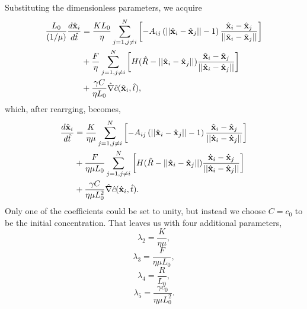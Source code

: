 Substituting the dimensionless parameters, we acquire
\begin{equation*}
    \begin{split}
        \frac{L_0}{(1/\mu)}\frac{d \hat{\vb{x}}_i}{d \hat{t}} &= 
        \frac{K L_0}{ \eta}\sum_{j = 1, j \neq i}^N   \left[ - A_{ij}\left( ||\hat{\vb{x}}_i - \hat{\vb{x}}_j|| -  1\right) \frac{\hat{\vb{x}}_i - \hat{\vb{x}}_j}{||\hat{\vb{x}}_i - \hat{\vb{x}}_j||} \right]\\
         &+ \frac{F}{  \eta}\sum_{j = 1, j \neq i}^N \left[H(\hat{R} - ||\hat{\vb{x}}_i - \hat{\vb{x}}_j||) \frac{\hat{\vb{x}}_i - \hat{\vb{x}}_j}{||\hat{\vb{x}}_i - \hat{\vb{x}}_j||}     \right]\\ 
         &+ \frac{\gamma C}{ \eta L_0} \hat{\nabla}  \hat{c} (\hat{\vb{x}}_i, \hat{t}),
    \end{split}
\end{equation*}
which, after rearrging, becomes,
\begin{equation*}
    \begin{split}
        \frac{d \hat{\vb{x}}_i}{d \hat{t}} &= 
        \frac{K}{ \eta \mu}\sum_{j = 1, j \neq i}^N   \left[ - A_{ij}\left( ||\hat{\vb{x}}_i - \hat{\vb{x}}_j|| -  1\right) \frac{\hat{\vb{x}}_i - \hat{\vb{x}}_j}{||\hat{\vb{x}}_i - \hat{\vb{x}}_j||} \right]\\
         &+ \frac{F}{  \eta \mu L_0}\sum_{j = 1, j \neq i}^N \left[H(\hat{R} - ||\hat{\vb{x}}_i - \hat{\vb{x}}_j||) \frac{\hat{\vb{x}}_i - \hat{\vb{x}}_j}{||\hat{\vb{x}}_i - \hat{\vb{x}}_j||}     \right]\\ 
         &+ \frac{\gamma C}{ \eta \mu L_0^2} \hat{\nabla}  \hat{c} (\hat{\vb{x}}_i, \hat{t}).
    \end{split}
\end{equation*}
Only one of the coefficients could be set to unity, but instead we choose $C = c_0$ to be the initial 
concentration. That leaves us with four additional parameters,
\begin{equation*}
    \lambda_2 = \frac{K}{ \eta \mu},
\end{equation*}
\begin{equation*}
    \lambda_3 = \frac{F}{  \eta \mu L_0},
\end{equation*}
\begin{equation*}
    \lambda_4 = \frac{R}{L_0},
\end{equation*}
\begin{equation*}
    \lambda_5 = \frac{\gamma c_0}{ \eta \mu L_0^2}.
\end{equation*}
